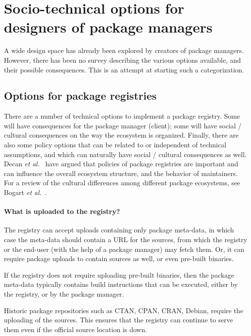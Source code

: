 \section{Socio-technical options for designers of package managers}

A wide design space has already been explored by creators of package managers.
However, there has been no survey describing the various options available, and their possible consequences.
This is an attempt at starting such a categorization.

\subsection{Options for package registries}

\label{sec:options-registries}

There are a number of technical options to implement a package registry.
Some will have consequences for the package manager (client); some will have social / cultural consequences on the way the ecosystem is organized.
Finally, there are also some policy options that can be related to or independent of technical assumptions, and which can naturally have social / cultural consequences as well.
Decan \emph{et al.}~\cite{decan2019empirical} have argued that policies of package registries are important and can influence the overall ecosystem structure, and the behavior of maintainers.
For a review of the cultural differences among different package ecosystems, see Bogart \emph{et al.}~\cite{Bogart2017}.

\paragraph{What is uploaded to the registry?}

The registry can accept uploads containing only package meta-data, in which case the meta-data should contain a URL for the sources, from which the registry or the end-user (with the help of a package manager) may fetch them.
Or, it can require package uploads to contain sources as well, or even pre-built binaries.

If the registry does not require uploading pre-built binaries, then the package meta-data typically contains build instructions that can be executed, either by the registry, or by the package manager.

Historic package repositories such as CTAN, CPAN, CRAN, Debian, require the uploading of the sources.
This ensures that the registry can continue to serve them even if the official source location is down.

